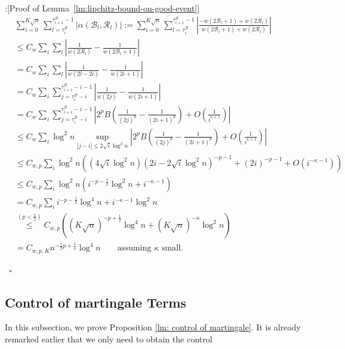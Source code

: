 \documentclass[twoside,12pt,a4paper]{article}
\numberwithin{equation}{section}
\newenvironment{proof}{{\sc Proof}:}{~\hfill $\square$}
\begin{document}
{\begin{proof}[Proof of Lemma~\ref{lm:lipchitz-bound-on-good-event}]
\begin{align*}
	&\sum_{i = 0}^{K \sqrt{n} } 
	\sum_{l = \tau_i^{\mathcal{B}}} ^{\tau_{i+1}^{\mathcal{B}}  -1}
	|\alpha(\mathcal{B}_l, \mathcal{R}_l)|
	:=
	\sum_{i = 0}^{K \sqrt{n} } 
	\sum_{l = \tau_i^{\mathcal{B}}} ^{\tau_{i+1}^{\mathcal{B}}  -1}
	\left|\frac{-w(2 \mathcal{B}_l + 1) + w(2 \mathcal{R}_l)}{w(2\mathcal{B}_l + 1) + w(2 \mathcal{R}_l)}\right|\\
	&\le C_w \sum_i \sum_l \left| \frac{1}{w(2 \mathcal{R}_l)} - \frac{1}{w(2 \mathcal{B}_l + 1)} \right|  \\
	&= C_w \sum_i \sum_l \left| \frac{1}{w(2 l - 2 i)} - \frac{1}{w(2i + 1)} \right|  \\
	&= C_w \sum_i \sum_{j = \tau_i^{\mathcal{B}} - i}^{\tau_{i+1}^{\mathcal{B}} - i - 1} \left| \frac{1}{w(2j)} - \frac{1}{w(2i + 1)} \right|  \\
	&= C_w \sum_i \sum_{j = \tau_i^{\mathcal{B}} - i}^{\tau_{i+1}^{\mathcal{B}} - i - 1} \left|  2^p B\left( \frac{1}{(2j)^p} - \frac{1}{(2i + 1)^p} \right)  + O\left( \frac{1}{i^{\kappa + 1}} \right) \right|  \\
	&\le C_w \sum_i \log^2 n \sup_{|j - i| \le 2 \sqrt{i}  \log^2 n} \left|  2^p B\left( \frac{1}{(2j)^p} - \frac{1}{(2i + 1)^p} \right)  + O\left( \frac{1}{i^{\kappa + 1}} \right) \right| \\
	&\le C_{w, p} \sum_i \log^2 n \left( 
		(4 \sqrt{ i } \log^2 n) (2 i - 2 \sqrt{ i } \log^2 n)^{- p - 1} + (2 i)^{- p - 1} + O(i^{- \kappa - 1})
	\right)  \\
	&\le C_{w, p} \sum_i \log^2 n \left( i ^{-p - \frac{1}{2}} \log^2 n +  i^{- \kappa - 1} \right)  \\
	&= C_{w, p} \sum_i i^{- p - \frac{1}{2}} \log^4 n + i^{- \kappa - 1 } \log^2 n \\
	&\stackrel{(p<\frac{1}{2})}{\le } C_{w, p} \left( (K \sqrt{ n} )^{-p+ \frac{1}{2}} \log^4 n + (K \sqrt{ n} )^{- \kappa } \log^2 n \right)  \\
	&= C_{w, p, K} n^{-\frac{1}{2}p + \frac{1}{4}  }  \log^4 n \qquad \text{assuming $\kappa$ small}
.\end{align*} 

\end{proof}



\subsection{Control of martingale Terms } 
In this subsection, we prove Proposition \ref{lm: control of martingale}. It is already remarked earlier that we only need to obtain the control

}
\end{document}
